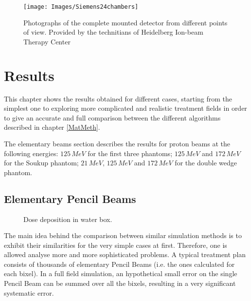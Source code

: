 \documentclass[12pt, a4paper, twoside]{book}
\begin{document}
\begin{figure}[b]
{\texttt{[image: Images/Siemens24chambers]}}
\caption{Photographs of the complete mounted detector from different points of view. Provided by the technitians of Heidelberg Ion-beam Therapy Center}
\label{fig:24cham}
\end{figure}




\chapter{Results} \label{res}%
\label{chap:res}

This chapter shows the results obtained for different cases, starting from the simplest one to exploring more complicated and realistic treatment fields in order to give an accurate and full comparison between the different algorithms described in chapter \ref{MatMeth}. 

The elementary beams section describes the results for proton beams at the following energies: $125\,MeV$ for the first three phantoms; $125\,MeV$ and $172\,MeV$ for the Soukup phantom; $21\,MeV$, $125\,MeV$ and $172\,MeV$ for the double wedge phantom.

\section{Elementary Pencil Beams}

\begin{figure}[!b]
\centering
{}\quad
{}\quad
{}\quad
\caption{Dose deposition in water box.}
\label{fig:WB1}
\vspace{-20mm}
\end{figure}
The main idea behind the comparison between similar simulation methods is to exhibit their similarities for the very simple cases at first. Therefore, one is allowed analyse more and more sophisticated problems. 
A typical treatment plan consists of thousands of elementary Pencil Beams (i.e. the ones calculated for each bixel). In a full field simulation, an hypothetical small error on the single Pencil Beam can be summed over all the bixels, resulting in a very significant systematic error.
\end{document}
